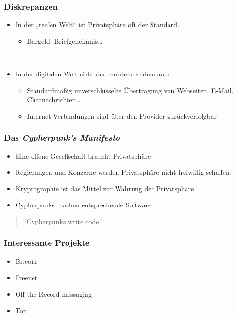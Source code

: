 \documentclass{beamer}
\begin{document}
\begin{frame}
\frametitle{Diskrepanzen}

	\begin{itemize}
		\item In der „realen Welt“ ist Privatsphäre oft der Standard.
		\begin{itemize}
			\item Bargeld, Briefgeheimnis…
		\end{itemize}
	
		\ \\
	
		\item In der digitalen Welt sieht das meistens anders aus:
		\begin{itemize}
			\item Standardmäßig unverschlüsselte Übertragung von Webseiten, E-Mail, Chatnachrichten\dots
			\item Internet-Verbindungen sind über den Provider zurückverfolgbar
		\end{itemize}
	\end{itemize}
\end{frame}

\begin{frame}
\frametitle{Das \textit{Cypherpunk’s Manifesto}}

	\begin{itemize}
		\item Eine offene Gesellschaft braucht Privatsphäre
		\item Regierungen und Konzerne werden Privatsphäre nicht freiwillig schaffen
		\item Kryptographie ist das Mittel zur Wahrung der Privatsphäre
		\item Cypherpunks machen entsprechende Software
	\end{itemize}

	\begin{quote}
		“Cypherpunks write code.”
	\end{quote}
\end{frame}

\begin{frame}
\frametitle{Interessante Projekte}

	\begin{itemize}
		\item Bitcoin
		\item Freenet
		\item Off-the-Record messaging
		\item Tor
	\end{itemize}
\end{frame}
\end{document}
